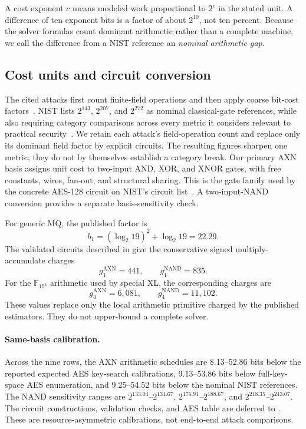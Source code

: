 \documentclass[11pt]{article}
\newcommand{\F}{\mathbb F}
\newcommand{\LoneNANDRange}{$2^{133.04}$--$2^{134.67}$}
\newcommand{\LthreeNANDRange}{$2^{175.91}$--$2^{188.67}$}
\newcommand{\LfiveNANDRange}{$2^{218.35}$--$2^{243.07}$}
\newcommand{\AXNNominalGapRange}{9.25--54.52}
\newcommand{\AXNExpectedAESGapRange}{8.13--52.86}
\newcommand{\AXNFullAESGapRange}{9.13--53.86}
\begin{document}
A cost exponent $c$ means modeled work proportional to $2^c$ in the stated
unit.  A difference of ten exponent bits is a factor of about $2^{10}$, not ten
percent.  Because the solver formulas count dominant arithmetic rather than a
complete machine, we call the difference from a NIST reference an
\emph{nominal arithmetic gap}.

\subsection{Cost units and circuit conversion}\label{sec:units}

The cited attacks first count finite-field operations and then apply coarse
bit-cost factors~\cite{Beullens2024SNOVA,Cabarcas2025SNOVA}.  NIST lists
$2^{143}$, $2^{207}$, and $2^{272}$ as nominal classical-gate references, while
also requiring category comparisons across every metric it considers relevant
to practical security~\cite{NISTPQCCriteria}.  We retain each attack's
field-operation count and replace only its dominant field factor by explicit
circuits.  The resulting figures sharpen one metric; they do not by themselves
establish a category break.  Our primary AXN basis assigns unit cost to two-input
AND, XOR, and XNOR gates, with free constants, wires, fan-out, and structural
sharing.  This is the gate family used by the concrete AES-128 circuit on
NIST's circuit list~\cite{NISTCircuitComplexity}.  A two-input-NAND conversion
provides a separate basis-sensitivity check.

For generic MQ, the published factor is
\begin{equation}\label{eq:published-f19-factor}
 b_1=(\log_2 19)^2+\log_2 19=22.29.
\end{equation}
The validated circuits described in
 give the conservative signed
multiply-accumulate charges
\begin{equation}\label{eq:axn-f19-factor}
 g_1^{\mathrm{AXN}}=441,
 \qquad g_1^{\mathrm{NAND}}=835.
\end{equation}
For the $\F_{19^4}$ arithmetic used by special XL, the corresponding charges
are
\begin{equation}\label{eq:axn-f194-factor}
 g_4^{\mathrm{AXN}}=6{,}081,
 \qquad g_4^{\mathrm{NAND}}=11{,}102.
\end{equation}
These values replace only the local arithmetic primitive charged by the
published estimators.  They do not upper-bound a complete solver.

\paragraph{Same-basis calibration.}
Across the nine rows, the AXN arithmetic schedules are
\AXNExpectedAESGapRange{} bits below the reported expected AES key-search
calibrations, \AXNFullAESGapRange{} bits below full-key-space AES enumeration,
and \AXNNominalGapRange{} bits below the nominal NIST references.  The NAND
sensitivity ranges are \LoneNANDRange, \LthreeNANDRange, and
\LfiveNANDRange.  The circuit constructions, validation checks, and AES table
are deferred to .  These are
resource-asymmetric calibrations, not end-to-end attack comparisons.
\end{document}
